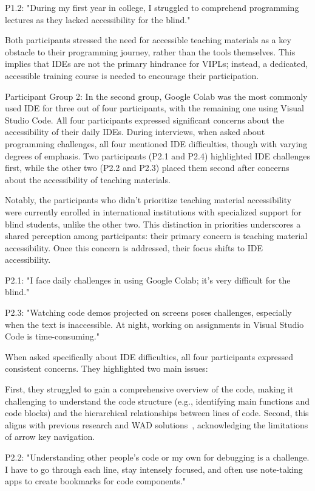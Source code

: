P1.2: "During my first year in college, I struggled to comprehend programming lectures as they lacked accessibility for the blind."

Both participants stressed the need for accessible teaching materials as a key obstacle to their programming journey, rather than the tools themselves. This implies that IDEs are not the primary hindrance for VIPLs; instead, a dedicated, accessible training course is needed to encourage their participation.

Participant Group 2: In the second group, Google Colab was the most commonly used IDE for three out of four participants, with the remaining one using Visual Studio Code. All four participants expressed significant concerns about the accessibility of their daily IDEs. During interviews, when asked about programming challenges, all four mentioned IDE difficulties, though with varying degrees of emphasis. Two participants (P2.1 and P2.4) highlighted IDE challenges first, while the other two (P2.2 and P2.3) placed them second after concerns about the accessibility of teaching materials.

Notably, the participants who didn't prioritize teaching material accessibility were currently enrolled in international institutions with specialized support for blind students, unlike the other two. This distinction in priorities underscores a shared perception among participants: their primary concern is teaching material accessibility. Once this concern is addressed, their focus shifts to IDE accessibility.

P2.1: "I face daily challenges in using Google Colab; it's very difficult for the blind."

P2.3: "Watching code demos projected on screens poses challenges, especially when the text is inaccessible. At night, working on assignments in Visual Studio Code is time-consuming."

When asked specifically about IDE difficulties, all four participants expressed consistent concerns. They highlighted two main issues:

First, they struggled to gain a comprehensive overview of the code,
making it challenging to understand the code structure (e.g.,
identifying main functions and code blocks) and the hierarchical
relationships between lines of code. Second, this aligns with previous
research and WAD solutions~\cite{wad07}, acknowledging the limitations of arrow
key navigation.

P2.2: "Understanding other people's code or my own for debugging is a challenge. I have to go through each line, stay intensely focused, and often use note-taking apps to create bookmarks for code components."

